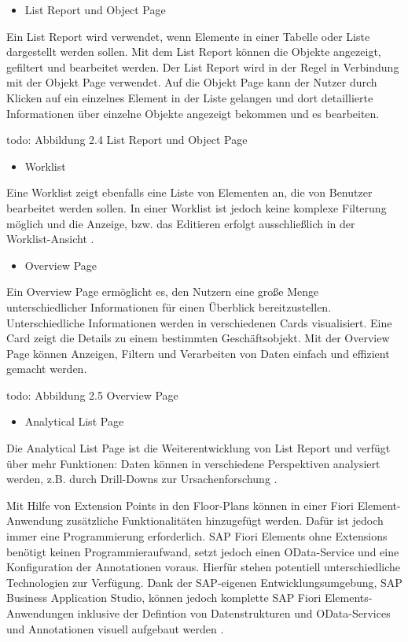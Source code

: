 \begin{itemize}[noitemsep]
\item List Report und Object Page
\end{itemize}

Ein List Report wird verwendet, wenn Elemente in einer Tabelle oder Liste dargestellt werden sollen. Mit dem List Report können die Objekte angezeigt, gefiltert und bearbeitet werden. Der List Report wird in der Regel in Verbindung mit der Objekt Page verwendet. Auf die Objekt Page kann der Nutzer durch Klicken auf ein einzelnes Element in der Liste gelangen und dort detaillierte Informationen über einzelne Objekte angezeigt bekommen und es bearbeiten.

todo: Abbildung 2.4 List Report und Object Page

\begin{itemize}[noitemsep]
\item Worklist
\end{itemize}

Eine Worklist zeigt ebenfalls eine Liste von Elementen an, die von Benutzer bearbeitet werden sollen. In einer Worklist ist jedoch keine komplexe Filterung möglich und die Anzeige, bzw. das Editieren erfolgt ausschließlich in der Worklist-Ansicht \cite{sap:ufef}.

\begin{itemize}[noitemsep]
\item Overview Page
\end{itemize}

Ein Overview Page ermöglicht es, den Nutzern eine große Menge unterschiedlicher Informationen für einen Überblick bereitzustellen. Unterschiedliche Informationen werden in verschiedenen Cards visualisiert. Eine Card zeigt die Details zu einem bestimmten Geschäftsobjekt. Mit der Overview Page können Anzeigen, Filtern und Verarbeiten von Daten einfach und effizient gemacht werden.

todo: Abbildung 2.5 Overview Page

\begin{itemize}[noitemsep]
\item Analytical List Page
\end{itemize}

Die Analytical List Page ist die Weiterentwicklung von List Report und verfügt über mehr Funktionen: Daten können in verschiedene Perspektiven analysiert werden, z.B. durch Drill-Downs zur Ursachenforschung \cite{sap:ufef}.

Mit Hilfe von Extension Points in den Floor-Plans können in einer Fiori Element-Anwendung zusätzliche Funktionalitäten hinzugefügt werden. Dafür ist jedoch immer eine Programmierung erforderlich.
SAP Fiori Elements ohne Extensions benötigt keinen Programmieraufwand, setzt jedoch einen OData-Service und eine Konfiguration der Annotationen voraus. Hierfür stehen potentiell unterschiedliche Technologien zur Verfügung. Dank der SAP-eigenen Entwicklungsumgebung, SAP Business Application Studio, können jedoch komplette SAP Fiori Elements-Anwendungen inklusive der Defintion von Datenstrukturen und OData-Services und Annotationen visuell aufgebaut werden \cite{sap:dafe}.




